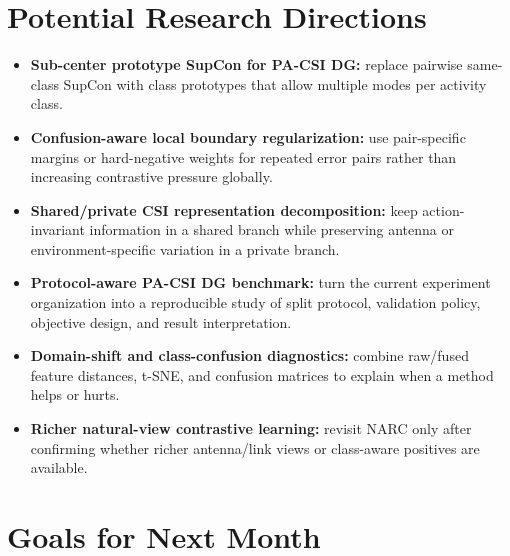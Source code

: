 \documentclass[11pt]{article}
\begin{document}
\section{Potential Research Directions}

\begin{itemize}[leftmargin=*]
    \item \textbf{Sub-center prototype SupCon for PA-CSI DG:} replace pairwise same-class SupCon with class prototypes that allow multiple modes per activity class.
    \item \textbf{Confusion-aware local boundary regularization:} use pair-specific margins or hard-negative weights for repeated error pairs rather than increasing contrastive pressure globally.
    \item \textbf{Shared/private CSI representation decomposition:} keep action-invariant information in a shared branch while preserving antenna or environment-specific variation in a private branch.
    \item \textbf{Protocol-aware PA-CSI DG benchmark:} turn the current experiment organization into a reproducible study of split protocol, validation policy, objective design, and result interpretation.
    \item \textbf{Domain-shift and class-confusion diagnostics:} combine raw/fused feature distances, t-SNE, and confusion matrices to explain when a method helps or hurts.
    \item \textbf{Richer natural-view contrastive learning:} revisit NARC only after confirming whether richer antenna/link views or class-aware positives are available.
\end{itemize}

\section{Goals for Next Month}
\end{document}
